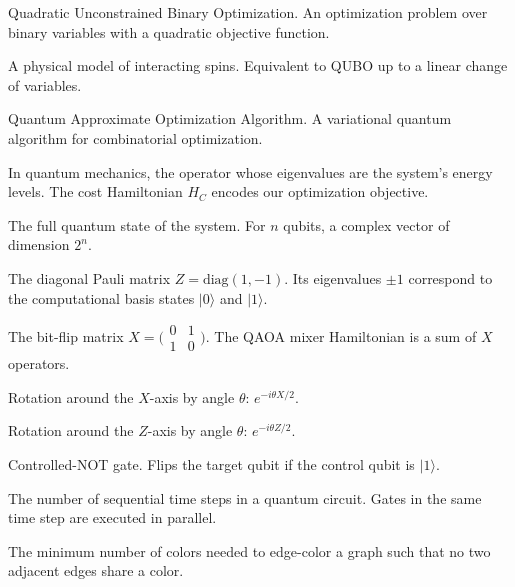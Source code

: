 \documentclass[12pt, a4paper]{article}
\begin{document}
\begin{description}[leftmargin=3cm, style=nextline]
    \item[QUBO] Quadratic Unconstrained Binary Optimization. An optimization
    problem over binary variables with a quadratic objective function.

    \item[Ising Model] A physical model of interacting spins. Equivalent to QUBO
    up to a linear change of variables.

    \item[QAOA] Quantum Approximate Optimization Algorithm. A variational quantum
    algorithm for combinatorial optimization.

    \item[Hamiltonian] In quantum mechanics, the operator whose eigenvalues are
    the system's energy levels. The cost Hamiltonian $H_C$ encodes our
    optimization objective.

    \item[Statevector] The full quantum state of the system. For $n$ qubits,
    a complex vector of dimension $2^n$.

    \item[Pauli-$Z$] The diagonal Pauli matrix $Z = \text{diag}(1, -1)$. Its
    eigenvalues $\pm 1$ correspond to the computational basis states $|0\rangle$
    and $|1\rangle$.

    \item[Pauli-$X$] The bit-flip matrix $X = \bigl(\begin{smallmatrix} 0 & 1 \\ 1 & 0 \end{smallmatrix}\bigr)$. The QAOA mixer Hamiltonian is a sum of $X$ operators.

    \item[$R_X(\theta)$] Rotation around the $X$-axis by angle $\theta$:
    $e^{-i\theta X/2}$.

    \item[$R_Z(\theta)$] Rotation around the $Z$-axis by angle $\theta$:
    $e^{-i\theta Z/2}$.

    \item[CNOT] Controlled-NOT gate. Flips the target qubit if the control qubit
    is $|1\rangle$.

    \item[Circuit Depth] The number of sequential time steps in a quantum circuit.
    Gates in the same time step are executed in parallel.

    \item[Chromatic Index] The minimum number of colors needed to edge-color a
    graph such that no two adjacent edges share a color.


\end{description}
\end{document}
